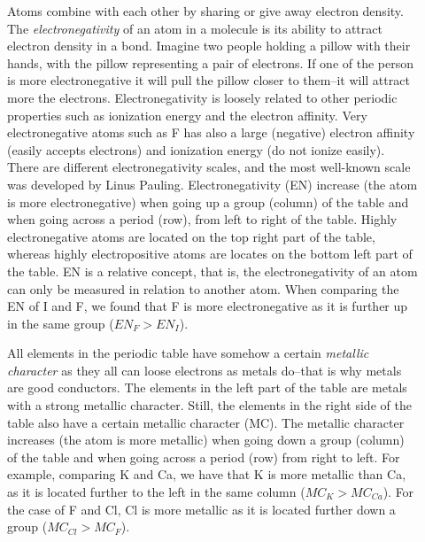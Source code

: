 \documentclass[main.tex]{subfiles}
\begin{document}
\begin{description}
\item[] 
Atoms combine with each other by sharing or give away electron density. The \emph{electronegativity} of an atom in a molecule is its ability to attract electron density in a bond. Imagine two people holding a pillow with their hands, with the pillow representing a pair of electrons. If one of the person is more electronegative it will pull the pillow closer to them--it will attract more the electrons. Electronegativity is loosely related to other periodic properties such as ionization energy and the electron affinity. Very electronegative atoms such as F has also a large (negative) electron affinity (easily accepts electrons) and ionization energy (do not ionize easily). There are different electronegativity scales, and the most well-known scale was developed by Linus Pauling. Electronegativity (EN) increase (the atom is more electronegative) when going up a group (column) of the table and when going across a period (row), from left to right of the table. Highly electronegative atoms are located on the top right part of the table, whereas highly electropositive atoms are locates on the bottom left part of the table. EN is a relative concept, that is, the electronegativity of an atom can only be measured in relation to another atom. When comparing the EN of I and F, we found that F is more electronegative as it is further up in the same group ($EN_{F}>EN_{I}$). 

\item[] 
All elements in the periodic table have somehow a certain \emph{metallic character} as they all can loose electrons as metals do--that is why metals are good conductors. The elements in the left part of the table are metals with a strong metallic character. Still, the elements in the right side of the table also have a certain metallic character (MC). The metallic character increases (the atom is more metallic) when going down a group (column) of the table and when going across a period (row) from right to left. For example, comparing K and Ca, we have that K is more metallic than Ca, as it is located further to the left in the same column ($MC_{K}>MC_{Ca}$). For the case of F and Cl, Cl is more metallic as it is located further down a group ($MC_{Cl}>MC_{F}$). 



\end{description}
\end{document}
